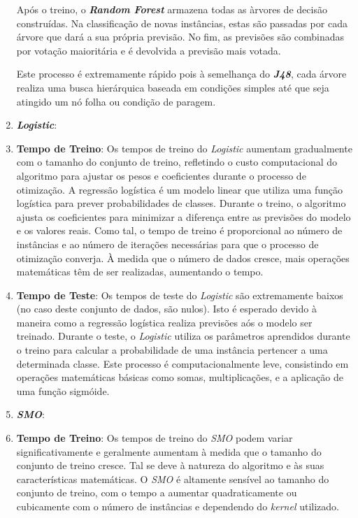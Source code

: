 \documentclass{easychair}
\begin{document}
\begin{enumerate}
Após o treino, o \textbf{\textit{Random Forest}} armazena todas as àrvores de decisão construídas. Na classificação de novas instâncias, estas são passadas por cada árvore que dará a sua própria previsão. No fim, as previsões são combinadas por votação maioritária e é devolvida a previsão mais votada.

Este processo é extremamente rápido pois à semelhança do \textbf{\textit{J48}}, cada árvore realiza uma busca hierárquica baseada em condições simples até que seja atingido um nó folha ou condição de paragem.
	\item \textbf{\textit{Logistic}}: 
		\item[\textbullet] \textbf{Tempo de Treino}: Os tempos de treino do \textit{Logistic} aumentam gradualmente com o tamanho do conjunto de treino, refletindo o custo computacional do algoritmo para ajustar os pesos e coeficientes durante o processo de otimização. A regressão logística é um modelo linear que utiliza uma função logística para prever probabilidades de classes. Durante o treino, o algoritmo ajusta os coeficientes para minimizar a diferença entre as previsões do modelo e os valores reais. Como tal, o tempo de treino é proporcional ao número de instâncias e ao número de iterações necessárias para que o processo de otimização converja. À medida que o número de dados cresce, mais operações matemáticas têm de ser realizadas, aumentando o tempo.
		\item[\textbullet] \textbf{Tempo de Teste}: Os tempos de teste do \textit{Logistic} são extremamente baixos (no caso deste conjunto de dados, são nulos). Isto é esperado devido à maneira como a regressão logística realiza previsões aós o modelo ser treinado. Durante o teste, o \textit{Logistic} utiliza os parâmetros aprendidos durante o treino para calcular a probabilidade de uma instância pertencer a uma determinada classe. Este processo é computacionalmente leve, consistindo em operações matemáticas básicas como somas, multiplicações, e a aplicação de uma função sigmóide.
	\item \textbf{\textit{SMO}}: 
		\item[\textbullet] \textbf{Tempo de Treino}: Os tempos de treino do \textit{SMO} podem variar significativamente e geralmente aumentam à medida que o tamanho do conjunto de treino cresce. Tal se deve à natureza do algoritmo e às suas características matemáticas. O \textit{SMO} é altamente sensível ao tamanho do conjunto de treino, com o tempo a aumentar quadraticamente ou cubicamente com o número de instâncias e dependendo do \textit{kernel} utilizado.

\end{enumerate}
\end{document}
